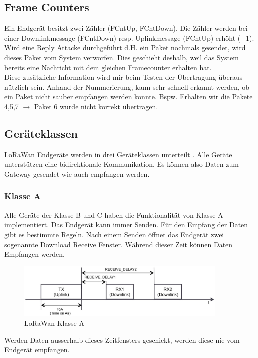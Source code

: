 \documentclass[11pt,english,german]{report}
\theoremstyle{definition}
\begin{document}
\subsection{Frame Counters}
Ein Endgerät besitzt zwei Zähler (FCntUp, FCntDown). Die Zähler werden bei einer Downlinkmessage (FCntDown) resp. Uplinkmessage (FCntUp) erhöht (+1).\\[0.3cm]
Wird eine Reply Attacke durchgeführt d.H. ein Paket nochmals gesendet, wird dieses Paket vom System verworfen. Dies geschieht deshalb, weil das System bereits eine Nachricht mit dem gleichen Framecounter erhalten hat.\\[0.3cm]
Diese zusätzliche Information wird mir beim Testen der Übertragung überaus nützlich sein. Anhand der Nummerierung, kann sehr schnell erkannt werden, ob ein Paket nicht sauber empfangen werden konnte. Bspw. Erhalten wir die Pakete 4,5,7 $\rightarrow$ Paket 6 wurde nicht korrekt übertragen.

\newpage
\subsection{Geräteklassen}
LoRaWan Endgeräte werden in drei Geräteklassen unterteilt \cite{lorawan_classes}. Alle Geräte unterstützen eine bidirektionale Kommunikation. Es können also Daten zum Gateway gesendet wie auch empfangen werden.
\subsubsection{Klasse A}
Alle Geräte der Klasse B und C haben die Funktionalität von Klasse A implementiert. Das Endgerät kann immer Senden. Für den Empfang der Daten gibt es bestimmte Regeln. Nach einem Senden öffnet das Endgerät zwei sogenannte Download Receive Fenster. Während dieser Zeit können Daten Empfangen werden. 

\begin{figure}[H]
	\centering
	\includegraphics[width=0.9\textwidth]{img/lora/lorawan_class_a.png}
	\caption[LoRaWan Klasse A]
	{LoRaWan Klasse A}
\end{figure}
\noindent
Werden Daten ausserhalb dieses Zeitfensters geschickt, werden diese nie vom Endgerät empfangen.
\end{document}
